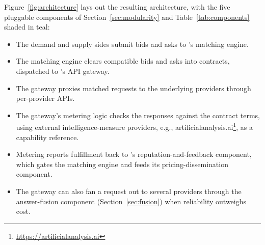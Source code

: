 Figure~\ref{fig:architecture} lays out the resulting architecture, with the
five pluggable components of Section~\ref{sec:modularity} and
Table~\ref{tab:components} shaded in teal:

\begin{itemize}
  \item The demand and supply sides submit bids and asks to
    \NoesisMarket{}'s matching engine.
  \item The matching engine clears compatible bids and asks into contracts,
    dispatched to \NoesisServer{}'s API gateway.
  \item The gateway proxies matched requests to the underlying providers
    through per-provider APIs.
  \item The gateway's metering logic checks the responses against the
    contract terms, using external intelligence-measure providers, e.g.,
    artificialanalysis.ai\footnote{\url{https://artificialanalysis.ai}}, as
    a capability reference.
  \item Metering reports fulfillment back to \NoesisMarket{}'s
    reputation-and-feedback component, which gates the matching engine and
    feeds its pricing-dissemination component.
  \item The gateway can also fan a request out to several providers through
    the answer-fusion component (Section~\ref{sec:fusion}) when reliability
    outweighs cost.
\end{itemize}


